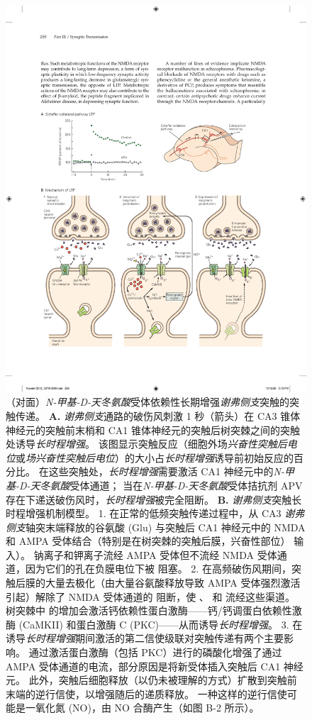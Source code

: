 \begin{figure}[htbp]
	\centering
	\includegraphics[width=0.85\linewidth]{chap13/fig_13_10}
	\caption{（对面）\textit{N-甲基-D-天冬氨酸}受体依赖性长期增强\textit{谢弗侧支}突触的突触传递。
		\textbf{A.} \textit{谢弗侧支}通路的破伤风刺激 1 秒（箭头）在 CA3 锥体神经元的突触前末梢和 CA1 锥体神经元的突触后树突棘之间的突触处诱导\textit{长时程增强}。
		该图显示突触反应（细胞外场\textit{兴奋性突触后电位}或\textit{场兴奋性突触后电位}）的大小占\textit{长时程增强}诱导前初始反应的百分比。
		在这些突触处，\textit{长时程增强}需要激活 CA1 神经元中的\textit{N-甲基-D-天冬氨酸}受体通道； 
		当在\textit{N-甲基-D-天冬氨酸}受体拮抗剂 APV 存在下递送破伤风时，\textit{长时程增强}被完全阻断\cite{morgan2001electrical}。
		\textbf{B.} \textit{谢弗侧支}突触长时程增强机制模型。
		1. 在正常的低频突触传递过程中，从 CA3 \textit{谢弗侧支}轴突末端释放的谷氨酸 (Glu) 与突触后 CA1 神经元中的 NMDA 和 AMPA 受体结合（特别是在树突棘的突触后膜，兴奋性部位） 输入）。
		钠离子和钾离子流经 AMPA 受体但不流经 NMDA 受体通道，因为它们的孔在负膜电位下被  阻塞。
		2. 在高频破伤风期间，突触后膜的大量去极化（由大量谷氨酸释放导致 AMPA 受体强烈激活引起）解除了 NMDA 受体通道的  阻断，使 、 和  流经这些渠道。
		树突棘中  的增加会激活钙依赖性蛋白激酶——钙/钙调蛋白依赖性激酶 (CaMKII) 和蛋白激酶 C (PKC)——从而诱导\textit{长时程增强}。
		3. 在诱导\textit{长时程增强}期间激活的第二信使级联对突触传递有两个主要影响。
		通过激活蛋白激酶（包括 PKC）进行的磷酸化增强了通过 AMPA 受体通道的电流，部分原因是将新受体插入突触后 CA1 神经元。
		此外，突触后细胞释放（以仍未被理解的方式）扩散到突触前末端的逆行信使，以增强随后的递质释放。
		一种这样的逆行信使可能是一氧化氮 (NO)，由 NO 合酶产生（如图 B-2 所示）。}
	\label{fig:13_10}
\end{figure}


